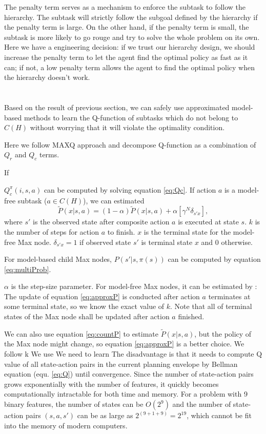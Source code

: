 \documentclass{article} %
\begin{document}
The penalty term serves as a mechanism to enforce the subtask to follow the hierarchy.
The subtask will strictly follow the subgoal defined by the hierarchy if the penalty term is large.
On the other hand, if the penalty term is small, the subtask is more likely to go rouge and try to 
solve the whole problem on its own. Here we have a engineering decision: if we trust our hierarchy design, 
we should increase the penalty term to let the agent find the optimal policy as fast as it can; 
if not, a low penalty term allows the agent to find the optimal policy when the hierarchy doesn't work.


\section{}
\label{se:Model}

Based on the result of previous section, we can safely use approximated model-based methods 
to learn the Q-function of subtasks which do not belong to $C(H)$ without worrying
that it will violate the optimality condition.

Here we follow MAXQ approach and decompose Q-function as a combination of $Q_r$ and $Q_c$ terms.

If 

$Q_c^{\pi}(i, s, a)$ can be computed by solving equation \ref{eq:Qc}.
If action $a$ is a model-free subtask ($a \in C(H)$), 
we can estimated 
\begin{equation}
    \tilde{P}(x|s, a) = (1-\alpha)\tilde{P}(x|s, a) + \alpha [ \gamma^N \delta_{s'x}],
    \label{eq:approxP}
\end{equation}
where $s'$ is the observed state after composite action $a$ is executed at state $s$.
$k$ is the number of steps for action $a$ to finish. 
$x$ is the terminal state for the model-free Max node. $\delta_{s'x}=1$ if observed state $s'$
is terminal state $x$ and 0 otherwise.

For model-based child Max nodes, $P(s'|s, \pi(s))$ can be computed by equation \ref{eq:multiProb}.

$\alpha$ is the step-size parameter.
For model-free Max nodes, it can be estimated by \cite{option}:
The update of equation \ref{eq:approxP} is conducted after action $a$ terminates at some terminal state,
so we know the exact value of $k$. Note that all of terminal states of the Max node shall be updated after 
action $a$ finished.

We can also use equation \ref{eq:countP} to estimate $\tilde{P}(x|s, a)$, but the policy of the Max node
might change, so equation \ref{eq:approxP} is a better choice.
We follow k
We use  We need to learn 
The disadvantage is that it needs to compute Q value of all state-action pairs in the current 
planning envelope by Bellman equation (equ. \ref{eq:Q}) until convergence.
Since the number of state-action pairs grows exponentially with the number of features,
it quickly becomes computationally intractable for both time and memory.
For a problem with 9 binary features, the number of states can be $O(2^9)$ and the
number of state-action pairs $(s, a, s')$ can be as large as $2^(9+1+9)=2^19$, which cannot be fit into the
memory of modern computers.
\end{document}
